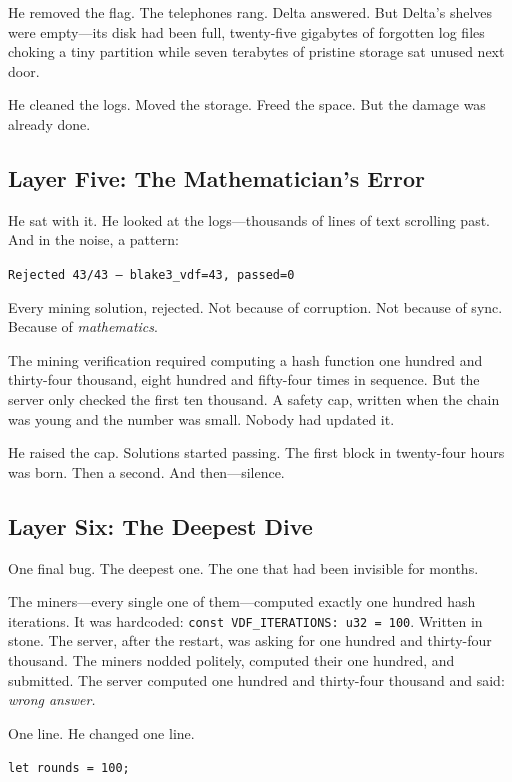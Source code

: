 \documentclass[11pt,a4paper]{article}
\begin{document}
He removed the flag. The telephones rang. Delta answered. But Delta's shelves were empty---its disk had been full, twenty-five gigabytes of forgotten log files choking a tiny partition while seven terabytes of pristine storage sat unused next door.

He cleaned the logs. Moved the storage. Freed the space. But the damage was already done.

\subsection*{Layer Five: The Mathematician's Error}

He sat with it. He looked at the logs---thousands of lines of text scrolling past. And in the noise, a pattern:

\begin{center}
\texttt{Rejected 43/43 --- blake3\_vdf=43, passed=0}
\end{center}

Every mining solution, rejected. Not because of corruption. Not because of sync. Because of \textit{mathematics}.

The mining verification required computing a hash function one hundred and thirty-four thousand, eight hundred and fifty-four times in sequence. But the server only checked the first ten thousand. A safety cap, written when the chain was young and the number was small. Nobody had updated it.

He raised the cap. Solutions started passing. The first block in twenty-four hours was born. Then a second. And then---silence.

\subsection*{Layer Six: The Deepest Dive}

One final bug. The deepest one. The one that had been invisible for months.

The miners---every single one of them---computed exactly one hundred hash iterations. It was hardcoded: \texttt{const VDF\_ITERATIONS: u32 = 100}. Written in stone. The server, after the restart, was asking for one hundred and thirty-four thousand. The miners nodded politely, computed their one hundred, and submitted. The server computed one hundred and thirty-four thousand and said: \textit{wrong answer.}

One line. He changed one line.

\begin{center}
\texttt{let rounds = 100;}
\end{center}
\end{document}
